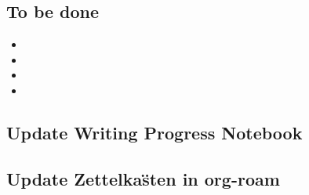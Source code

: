 \documentclass[10pt,letterpaper]{article}
\newcommand{\bi}{\begin{itemize}}
\newcommand{\ei}{\end{itemize}}
\begin{document}
\subsection{To be done}
\label{sub:to-do}


\bi
\item 
\item 
\item 
\item 
\ei




\subsection{Update Writing Progress Notebook}
\label{sub:WPsheet}







\subsection{Update Zettelka\"sten in org-roam}
\label{sub:zk}

\end{document}
